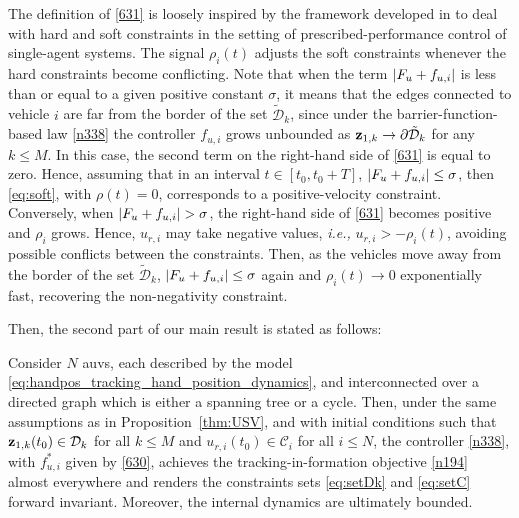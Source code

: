 \begin{rmk}
	The definition of \eqref{631} is loosely inspired by the framework developed in \cite{mehdifar2022funnel} to deal with hard and soft constraints in the setting of prescribed-performance control of single-agent systems.
	The signal $\rho_i(t)$ adjusts the soft constraints whenever the hard constraints become conflicting. 
	Note that when the term $\left|F_{u}+f_{u, i}\right|$ is less than or equal to a given positive constant $\sigma$, it means that the edges connected to vehicle $i$ are far from the border of the set $\tilde{\mathcal{D}}_k$, since under the barrier-function-based law \eqref{n338} the controller $f_{u, i}$ grows unbounded as $\mathbf{z}_{1, k}\rightarrow\partial\tilde{\mathcal{D}}_k$ for any $k\leq M$.
	In this case, the second term on the right-hand side of \eqref{631} is equal to zero. Hence, assuming that in an interval $t\in[t_0,t_0+T]$, $\left|F_{u}+f_{u, i}\right|\leq \sigma$, then \eqref{eq:soft}, with $\rho(t)=0$, corresponds to a positive-velocity constraint.
	Conversely, when $\abs{F_{u}+f_{u, i}}>\sigma$, the right-hand side of \eqref{631} becomes positive and $\rho_i$ grows. Hence, $u_{r, i}$ may take negative values, \emph{i.e.,} $u_{r, i}>-\rho_i(t)$, avoiding possible conflicts between the constraints. Then, as the vehicles move away from the border of the set $\tilde{\mathcal{D}}_k$, $\left|F_{u}+f_{u, i}\right|\leq\sigma$ again and $\rho_i(t)\rightarrow0$ exponentially fast, recovering the non-negativity constraint.
\end{rmk}

Then, the second part of our main result is stated as follows:
\begin{prop}\label{thm:USV-2}
	Consider $N$ \glspl{auv}, each described by the model \eqref{eq:handpos_tracking_hand_position_dynamics}, and interconnected over a directed graph which is either a spanning tree or a cycle.
	Then, under the same assumptions as in Proposition~\ref{thm:USV}, and with initial conditions such that $\mathbf{z}_{1, k}(t_0)\in\mathcal{D}_k$ for all $k\leq M$ and $u_{r, i}(t_0)\in\mathcal{C}_i$ for all $i\leq N$, the controller \eqref{n338}, with $f_{u, i}^*$ given by \eqref{630}, achieves the tracking-in-formation objective \eqref{n194} almost everywhere and renders the constraints sets \eqref{eq:setDk} and \eqref{eq:setC} forward invariant.
	Moreover, the internal dynamics are ultimately bounded.
\end{prop}

